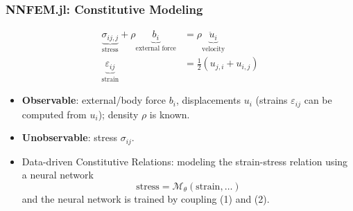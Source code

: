 \documentclass[usenames,dvipsnames]{beamer}
\begin{document}
\begin{frame}
	\frametitle{NNFEM.jl: Constitutive Modeling}
	
	\begin{equation}\label{equ:momentum}
  \begin{aligned}
		\underbrace{\sigma_{ij,j}}_{\mbox{stress}} + \rho \underbrace{b_i}_{\mbox{external force}} &= \rho \underbrace{\ddot u_i}_{\mbox{velocity}}\\
		\underbrace{\varepsilon_{ij}}_{\mbox{strain}} &= \frac{1}{2}(u_{j,i}+u_{i,j})
	\end{aligned}
\end{equation}

	
	\begin{itemize}
		\item \textbf{Observable}: external/body force $b_i$, displacements $u_i$ (strains $\varepsilon_{ij}$ can be computed from $u_i$); density $\rho$ is known.  
		\item \textbf{Unobservable}: stress $\sigma_{ij}$. 
		\item Data-driven Constitutive Relations: modeling the strain-stress relation using a neural network
\begin{equation}\label{equ:nn}
  	\boxed{\mbox{stress} =\mathcal{M}_{\theta}(\mbox{strain},\ldots)}
\end{equation}
		and the neural network is trained by coupling (1) and (2).
	\end{itemize}


\end{frame}
\end{document}
